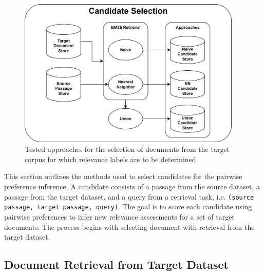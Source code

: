 \begin{figure}[ht]
    \centering
    \includegraphics[width=0.95\textwidth]{./graphics/drawio/candidate_selection.png}
    \caption{Tested approaches for the selection of documents from the target corpus for which relevance labels are to be determined.}
\end{figure}

This section outlines the methods used to select candidates for the pairwise preference inference. A candidate consists of a passage from the source dataset, a passage from the target dataset, and a query from a retrieval task, i.e. \texttt{(source passage, target passage, query)}. The goal is to score each candidate using pairwise preferences to infer new relevance assessments for a set of target documents. The process begins with selecting document with retrieval from the target dataset.

\subsection{Document Retrieval from Target Dataset}\label{document-retrieval-from-target-dataset}

